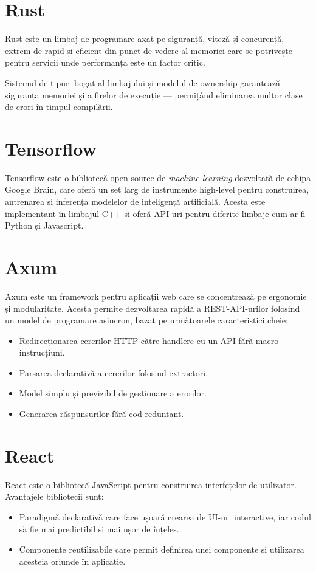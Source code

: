 \documentclass[12pt,a4paper]{report}
\begin{document}
\section{Rust}
Rust\cite{rustlang} este un limbaj de programare axat pe siguranță, viteză și concurență, extrem de rapid și eficient din punct de vedere al memoriei care se potrivește pentru servicii unde performanța este un factor critic.

Sistemul de tipuri bogat al limbajului și modelul de ownership garantează siguranța memoriei și a firelor de execuție — permițând eliminarea multor clase de erori în timpul compilării.

\section{Tensorflow}
Tensorflow\cite{tensorflow2015-whitepaper} este o bibliotecă open-source de \textit{machine learning} dezvoltată de echipa Google Brain,
care oferă un set larg de instrumente high-level pentru construirea, antrenarea și inferența modelelor de inteligență artificială.
Acesta este implementant în limbajul C++ și oferă API-uri pentru diferite limbaje cum ar fi Python și Javascript.

\section{Axum}
Axum\cite{axum-framework} este un framework pentru aplicații web care se concentrează pe ergonomie și modularitate.
Acesta permite dezvoltarea rapidă a REST-API-urilor folosind un model de programare asincron, bazat pe următoarele caracteristici cheie:
\begin{itemize}
      \item Redirecționarea cererilor HTTP către handlere cu un API fără macro-instrucțiuni.
      \item Parsarea declarativă a cererilor folosind extractori.
      \item Model simplu și previzibil de gestionare a erorilor.
      \item Generarea răspunsurilor fără cod reduntant.
\end{itemize}


\section{React}
React\cite{react} este o bibliotecă JavaScript pentru construirea interfețelor de utilizator. Avantajele bibliotecii sunt:
\begin{itemize}
      \item Paradigmă declarativă care face ușoară crearea de UI-uri interactive, iar codul să fie mai predictibil și mai ușor de înțeles.
      \item Componente reutilizabile care permit definirea unei componente și utilizarea acesteia oriunde în aplicație.
\end{itemize}
\end{document}
